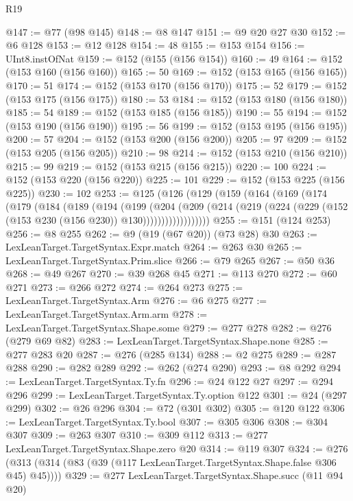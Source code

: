 \begin{lexlean}{R19}
\begin{coremodule}
@147 := @77 (@98 @145)
@148 := @8 @147
@151 := @9 @20 @27 @30
@152 := @6 @128
@153 := @12 @128
@154 := 48
@155 := @153 @154
@156 := UInt8.instOfNat
@159 := @152 (@155 (@156 @154))
@160 := 49
@164 := @152 (@153 @160 (@156 @160))
@165 := 50
@169 := @152 (@153 @165 (@156 @165))
@170 := 51
@174 := @152 (@153 @170 (@156 @170))
@175 := 52
@179 := @152 (@153 @175 (@156 @175))
@180 := 53
@184 := @152 (@153 @180 (@156 @180))
@185 := 54
@189 := @152 (@153 @185 (@156 @185))
@190 := 55
@194 := @152 (@153 @190 (@156 @190))
@195 := 56
@199 := @152 (@153 @195 (@156 @195))
@200 := 57
@204 := @152 (@153 @200 (@156 @200))
@205 := 97
@209 := @152 (@153 @205 (@156 @205))
@210 := 98
@214 := @152 (@153 @210 (@156 @210))
@215 := 99
@219 := @152 (@153 @215 (@156 @215))
@220 := 100
@224 := @152 (@153 @220 (@156 @220))
@225 := 101
@229 := @152 (@153 @225 (@156 @225))
@230 := 102
@253 := @125
    (@126
      (@129
        (@159
          (@164
            (@169
              (@174
                (@179
                  (@184
                    (@189
                      (@194
                        (@199
                          (@204
                            (@209
                              (@214
                                (@219
                                  (@224 (@229 (@152 (@153 @230 (@156 @230)) @130))))))))))))))))))
@255 := @151 (@124 @253)
@256 := @8 @255
@262 := @9 (@19 (@67 @20)) (@73 @28) @30
@263 := LexLeanTarget.TargetSyntax.Expr.match
@264 := @263 @30
@265 := LexLeanTarget.TargetSyntax.Prim.slice
@266 := @79 @265
@267 := @50 @36
@268 := @49 @267
@270 := @39 @268 @45
@271 := @113 @270
@272 := @60 @271
@273 := @266 @272
@274 := @264 @273
@275 := LexLeanTarget.TargetSyntax.Arm
@276 := @6 @275
@277 := LexLeanTarget.TargetSyntax.Arm.arm
@278 := LexLeanTarget.TargetSyntax.Shape.some
@279 := @277 @278
@282 := @276 (@279 @69 @82)
@283 := LexLeanTarget.TargetSyntax.Shape.none
@285 := @277 @283 @20
@287 := @276 (@285 @134)
@288 := @2 @275
@289 := @287 @288
@290 := @282 @289
@292 := @262 (@274 @290)
@293 := @8 @292
@294 := LexLeanTarget.TargetSyntax.Ty.fn
@296 := @24 @122 @27
@297 := @294 @296
@299 := LexLeanTarget.TargetSyntax.Ty.option @122
@301 := @24 (@297 @299)
@302 := @26 @296
@304 := @72 (@301 @302)
@305 := @120 @122
@306 := LexLeanTarget.TargetSyntax.Ty.bool
@307 := @305 @306
@308 := @304 @307
@309 := @263 @307
@310 := @309 @112
@313 := @277 LexLeanTarget.TargetSyntax.Shape.zero @20
@314 := @119 @307
@324 := @276 (@313 (@314 (@83 (@39 (@117 LexLeanTarget.TargetSyntax.Shape.false @306 @45) @45))))
@329 := @277 LexLeanTarget.TargetSyntax.Shape.succ (@11 @94 @20)

\end{coremodule}
\end{lexlean}
